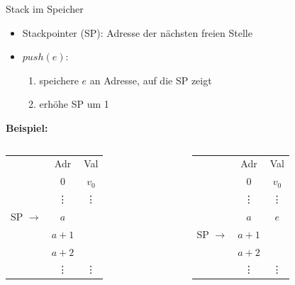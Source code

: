 \begin{frame}{Stack im Speicher}
	\begin{itemize}
		\item Stackpointer (SP): Adresse der nächsten freien Stelle
		\item $push(e)$: \begin{enumerate}
			\item speichere $e$ an Adresse, auf die SP zeigt
			\item erhöhe SP um 1
		\end{enumerate}
	\end{itemize}

	\bigskip
	\textbf{Beispiel:}
	\begin{columns}
		\begin{column}{.3\textwidth}
			\centering \begin{tabular}{cc|c}
				& Adr & Val \\
				\cline{2-3}
				& $0$ & $v_0$ \\
				& \vdots & \vdots \\
				SP $\rightarrow$ & $a$ & \\
				& $a + 1$ &  \\
				& $a + 2$ &  \\
				& \vdots & \vdots 
			\end{tabular}
		\end{column}
	
		\begin{column}{.3\textwidth}
			\centering \begin{tabular}{cc|c}
				& Adr & Val \\
				\cline{2-3}
				& $0$ & $v_0$ \\
				& \vdots & \vdots \\
				& $a$ & $e$\\
				SP $\rightarrow$ & $a + 1$ &  \\
				& $a + 2$ &  \\
				& \vdots & \vdots 
			\end{tabular}
		\end{column}
	\end{columns}
\end{frame}

